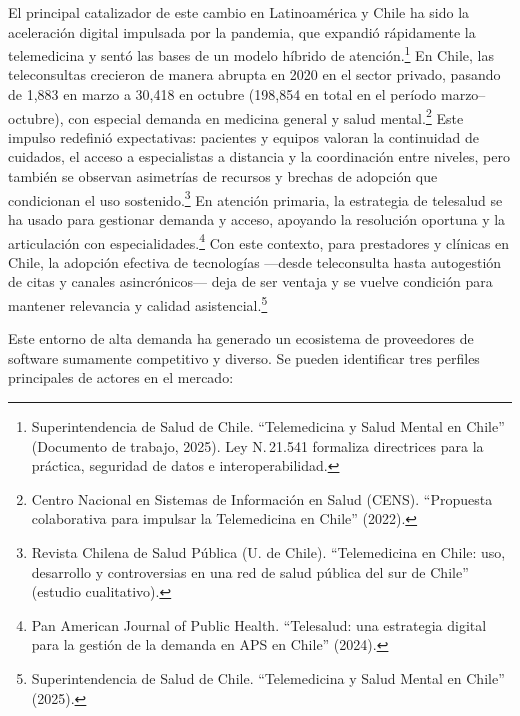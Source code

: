 El principal catalizador de este cambio en Latinoamérica y Chile ha sido la aceleración digital impulsada por la pandemia, que expandió rápidamente la telemedicina y sentó las bases de un modelo híbrido de atención.\footnote{Superintendencia de Salud de Chile. ``Telemedicina y Salud Mental en Chile'' (Documento de trabajo, 2025). Ley N.\,21.541 formaliza directrices para la práctica, seguridad de datos e interoperabilidad.} En Chile, las teleconsultas crecieron de manera abrupta en 2020 en el sector privado, pasando de 1{,}883 en marzo a 30{,}418 en octubre (198{,}854 en total en el período marzo--octubre), con especial demanda en medicina general y salud mental.\footnote{Centro Nacional en Sistemas de Información en Salud (CENS). ``Propuesta colaborativa para impulsar la Telemedicina en Chile'' (2022).} Este impulso redefinió expectativas: pacientes y equipos valoran la continuidad de cuidados, el acceso a especialistas a distancia y la coordinación entre niveles, pero también se observan asimetrías de recursos y brechas de adopción que condicionan el uso sostenido.\footnote{Revista Chilena de Salud Pública (U. de Chile). ``Telemedicina en Chile: uso, desarrollo y controversias en una red de salud pública del sur de Chile'' (estudio cualitativo).} En atención primaria, la estrategia de telesalud se ha usado para gestionar demanda y acceso, apoyando la resolución oportuna y la articulación con especialidades.\footnote{Pan American Journal of Public Health. ``Telesalud: una estrategia digital para la gestión de la demanda en APS en Chile'' (2024).} Con este contexto, para prestadores y clínicas en Chile, la adopción efectiva de tecnologías —desde teleconsulta hasta autogestión de citas y canales asincrónicos— deja de ser ventaja y se vuelve condición para mantener relevancia y calidad asistencial.\footnote{Superintendencia de Salud de Chile. ``Telemedicina y Salud Mental en Chile'' (2025).}


Este entorno de alta demanda ha generado un ecosistema de proveedores de software sumamente competitivo y diverso. Se pueden identificar tres perfiles principales de actores en el mercado:

